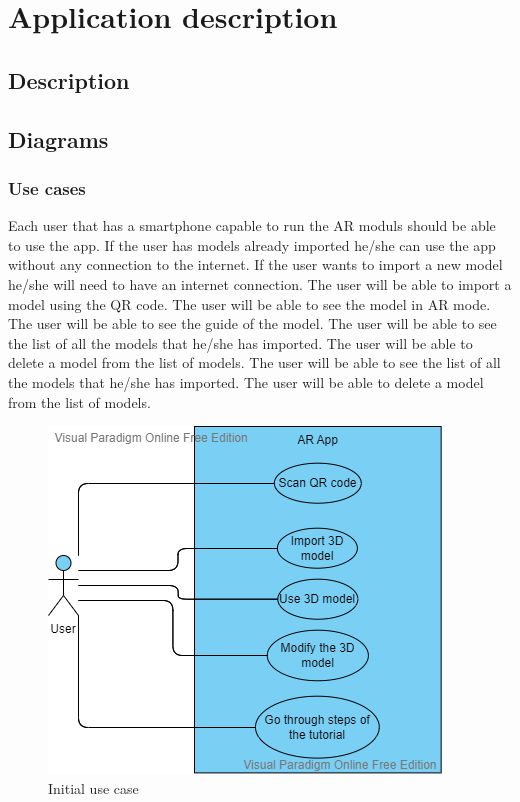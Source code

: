 \chapter{Application description}\label{chapter:appdescription}




\section{Description}
\pagebreak
\section{Diagrams}
\subsection{Use cases}
Each user that has a smartphone capable to run the AR moduls should be able to use the app. If the user has models already imported he/she can use the app without any connection to the internet. If the user wants to import a new model he/she will need to have an internet connection. The user will be able to import a model using the QR code. The user will be able to see the model in AR mode. The user will be able to see the guide of the model. The user will be able to see the list of all the models that he/she has imported. The user will be able to delete a model from the list of models. The user will be able to see the list of all the models that he/she has imported. The user will be able to delete a model from the list of models.
\begin{figure}[h!]
    \begin{center}
        \includegraphics{img/InitialUseCase.png}
        \caption{Initial use case}
        \label{fig:InitialUseCase}
    \end{center}
\end{figure}
\pagebreak

